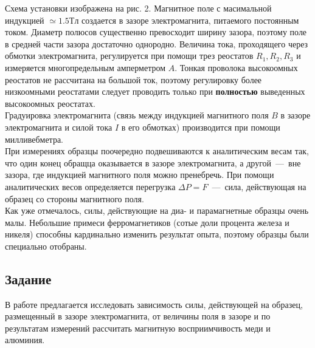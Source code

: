 \documentclass[a4paper, 12pt]{article}
\newcommand{\mysec}[1]{\begin{center}\section*{#1}\end{center}}
\begin{document}
Схема установки изображена на рис. 2. 
Магнитное поле с масимальной индукцией $\simeq 1.5 Тл$ создается в зазоре электромагнита, питаемого постоянным током. 
Диаметр полюсов существенно превосходит ширину зазора, поэтому поле в средней части зазора достаточно однородно. 
Величина тока, проходящего через обмотки электромагнита, регулируется при помощи трез реостатов $R_1, R_2, R_3$  и измеряется многопредельным амперметром $A$. 
Тонкая проволока высокоомных реостатов не рассчитана на большой ток, поэтому регулировку более низкоомными реостатами следует проводить только при \textbf{полностью} выведенных высокоомных реостатах.
\\
Градуировка электромагнита (связь между индукцией магнитного поля $B$ в зазоре электромагнита и силой тока $I$ в его обмотках) производится при помощи милливебметра.
\\
При измерениях образцы поочередно подвешиваются к аналитическим весам так, что один конец обращца оказывается в зазоре электромагнита, а другой~---~вне зазора, где индукцией магнитного поля можно пренебречь. 
При помощи аналитических весов определяется перегрузка $\Delta P=F$~---~сила, действующая на образец со стороны магнитного поля.
\\
Как уже отмечалось, силы, действующие на диа- и парамагнетные образцы очень малы.
Небольшие примеси ферромагнетиков (сотые доли процента железа и никеля) способны кардинально изменить результат опыта, поэтому образцы были специально отобраны.

\mysec{Задание}

В работе предлагается исследовать зависимость силы, действующей на образец, размещенный в зазоре электромагнита, от величины поля в зазоре и по результатам измерений рассчитать магнитную восприимчивость меди и алюминия.
\end{document}
